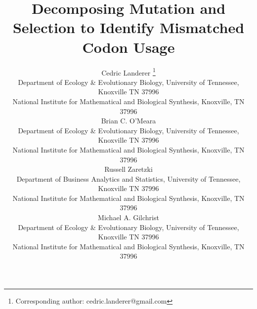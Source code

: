 \documentclass[fleqn,letterpaper]{article}
\begin{document}
\linenumbers

  \newcommand{\package}{\textbf{AnaCoDa}\xspace} %
  \newcommand{\kluyveri}{\textit{L. kluyveri}\xspace}
  \newcommand{\dubl}{\textit{C. dubliniensis}\xspace}
  \newcommand{\gossypii}{\textit{E. gossypii}\xspace}
  \newcommand{\ROC}{ROC SEMPPR\xspace}
  \newcommand{\GC}{GC content\xspace}
  \newcommand{\DM}{\ensuremath{{\Delta M}}\xspace}
  \newcommand{\DE}{\ensuremath{{\Delta \eta}}\xspace}
  \newcommand{\Lik}{\ensuremath{\mathcal{L}}\xspace}

  
\title{Decomposing Mutation and Selection to Identify Mismatched Codon Usage}



\author{
  Cedric Landerer \thanks{Corresponding author: cedric.landerer@gmail.com}\\
  \small  Department of Ecology \& Evolutionary  Biology, University of Tennessee, Knoxville TN 37996\\
  \small National Institute for Mathematical and Biological Synthesis, Knoxville, TN 37996\\
  Brian C. O'Meara \\
  \small  Department of Ecology \& Evolutionary  Biology, University of Tennessee, Knoxville TN 37996\\
  \small National Institute for Mathematical and Biological Synthesis, Knoxville, TN 37996\\
  Russell Zaretzki\\ 
  \small Department of Business Analytics and Statistics, University of Tennessee, Knoxville TN 37996\\
  \small National Institute for Mathematical and Biological Synthesis, Knoxville, TN 37996\\
  Michael A. Gilchrist\\
  \small  Department of Ecology \& Evolutionary  Biology, University of Tennessee, Knoxville TN 37996\\
  \small National Institute for Mathematical and Biological Synthesis, Knoxville, TN 37996\\
}



\maketitle


\pagebreak
  
\end{document}
